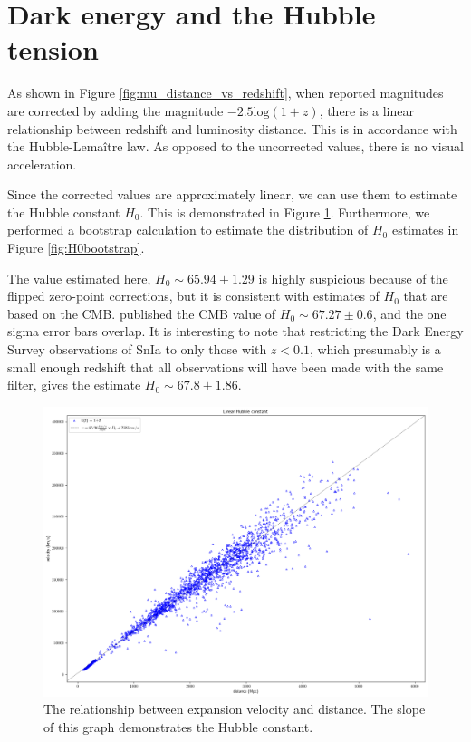 \documentclass[linenumbers]{aastex631}
\begin{document}
\section{Dark energy and the Hubble tension}
\label{sec:tension}

As shown in Figure \ref{fig:mu_distance_vs_redshift}, when reported magnitudes
are corrected by adding the magnitude $-2.5\text{log}(1+z)$, there is a linear
relationship between redshift and luminosity distance. This is in accordance
with the Hubble-Lema\^{i}tre law. As opposed to the uncorrected values, there
is no visual acceleration.

Since the corrected values are approximately linear, we can use them to
estimate the Hubble constant $H_0$. This is demonstrated in Figure
\ref{fig:expansion}. Furthermore, we performed a bootstrap calculation to
estimate the distribution of $H_0$ estimates in Figure \ref{fig:H0bootstrap}.

The value estimated here, $H_0 \sim 65.94 \pm 1.29$ is highly suspicious
because of the flipped zero-point corrections, but it is consistent with
estimates of $H_0$ that are based on the CMB. \citet{planck2020} published the
CMB value of $H_0 \sim 67.27 \pm 0.6$, and the one sigma error bars overlap. It
is interesting to note that restricting the Dark Energy Survey observations of
SnIa \citep{vincenzi2024} to only those with $z < 0.1$, which presumably is a
small enough redshift that all observations will have been made with the same
filter, gives the estimate $H_0 \sim 67.8 \pm 1.86$.

\begin{figure}
  \includegraphics[width=\linewidth]{velocity_vs_distance.png}
  \caption{The relationship between expansion velocity and distance. The slope of this graph demonstrates the Hubble constant.
  }
\label{fig:expansion}
\end{figure}
\end{document}
